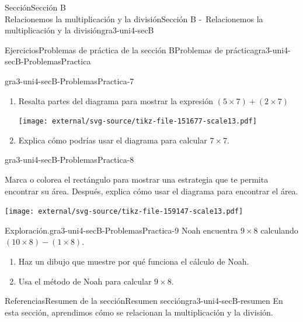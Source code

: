 \begin{sectionptx}{Sección}{{\Large Sección B\\}Relacionemos la multiplicación y la división}{}{Sección B -~Relacionemos la multiplicación y la división}{}{}{gra3-uni4-secB}
\begin{exercises-subsection}{Ejercicios}{Problemas de práctica de la sección B}{}{Problemas de práctica}{}{}{gra3-uni4-secB-ProblemasPractica}
\begin{divisionexercise}{5}{}{}{gra3-uni4-secB-ProblemasPractica-7}
\begin{enumerate}[label={(\alph*)}]
\item{}Resalta partes del diagrama para mostrar la expresión \((5 \times 7) + (2 \times 7)\)%
\begin{image}{0}{1}{0}{}%
\texttt{[image: external/svg-source/tikz-file-151677-scale13.pdf]}
\end{image}%
\item{}Explica cómo podrías usar el diagrama para calcular \(7\times 7\).%
\end{enumerate}
\end{divisionexercise}%
\begin{divisionexercise}{6}{}{}{gra3-uni4-secB-ProblemasPractica-8}%
\vspace{-1.4\baselineskip}
\begin{sidebyside}{2}{0}{0}{0}%
\begin{sbspanel}{0.6}%
Marca o colorea el rectángulo para mostrar una estrategia que te permita encontrar su área. Después, explica cómo usar el diagrama para encontrar el área.%
\end{sbspanel}%
\begin{sbspanel}{0.4}%
\texttt{[image: external/svg-source/tikz-file-159147-scale13.pdf]}
\end{sbspanel}%
\end{sidebyside}%
\end{divisionexercise}%
\clearpage
\begin{divisionexercise}{7}{Exploración.}{}{gra3-uni4-secB-ProblemasPractica-9}%
Noah encuentra \(9 \times 8\) calculando \((10 \times 8) - (1 \times 8)\).%
%
\begin{enumerate}[label={(\alph*)}]
\item{}Haz un dibujo que muestre por qué funciona el cálculo de Noah.%
\item{}Usa el método de Noah para calcular \(9\times 8\).%
\end{enumerate}
\end{divisionexercise}%
\end{exercises-subsection}
%
%
\typeout{************************************************}
\typeout{************************************************}
%
\begin{references-subsection}{Referencias}{Resumen de la sección}{}{Resumen sección}{}{}{gra3-uni4-secB-resumen}
En esta sección, aprendimos cómo se relacionan la multiplicación y la división.%
\begin{image}{0}{1}{0}{}%

\end{image}
\end{references-subsection}
\end{sectionptx}
